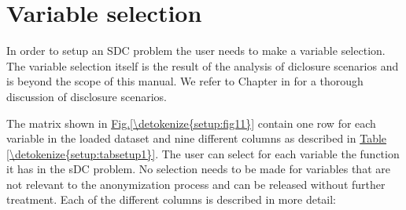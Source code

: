 \documentclass[letterpaper,10pt,english]{sphinxmanual}
\begin{document}
\section{Variable selection}
\label{\detokenize{setup:variable-selection}}
In order to setup an SDC problem the user needs to make a variable selection. The variable
selection itself is the result of the analysis of diclosure scenarios and is beyond the scope
of this manual. We refer to Chapter in for a thorough discussion of disclosure scenarios.

The matrix shown in \hyperref[\detokenize{setup:fig11}]{Fig.\@ \ref{\detokenize{setup:fig11}}} contain one row for each variable in the loaded dataset
and nine different columns as described in \hyperref[\detokenize{setup:tabsetup1}]{Table \ref{\detokenize{setup:tabsetup1}}}. The user can select for each
variable the function it has in the sDC problem. No selection needs to
be made for variables that are not relevant to the
anonymization process and can be released without further treatment. Each of the different
columns is described in more detail:
\end{document}
